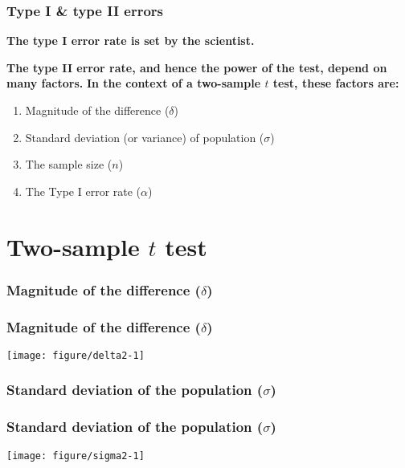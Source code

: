 \documentclass[color=usenames,dvipsnames]{beamer}\usepackage[]{graphicx}\usepackage[]{color}
\begin{document}
\begin{frame}
  \frametitle{Type I \& type II errors}
  {\bf The type I error rate is set by the scientist.} \par
  \pause
  \vfill
  {\bf The type II error rate, and hence the power of the test, depend
    on many factors.}
  \pause
  \vfill
  {\bf In the context of a two-sample $t$ test, these factors are:}
  \begin{enumerate}[\bf (1)]
    \item Magnitude of the difference ($\delta$)
    \item Standard deviation (or variance) of population ($\sigma$)
    \item The sample size ($n$)
    \item The Type I error rate ($\alpha$)
  \end{enumerate}
\end{frame}




\section{Two-sample $t$ test}



\begin{frame}[fragile]
  \frametitle{Magnitude of the difference ($\delta$)}


\end{frame}




\begin{frame}[fragile]
  \frametitle{Magnitude of the difference ($\delta$)}
\texttt{[image: figure/delta2-1]}
\end{frame}








\begin{frame}[fragile]
  \frametitle{Standard deviation of the population ($\sigma$)}


\end{frame}




\begin{frame}[fragile]
  \frametitle{Standard deviation of the population ($\sigma$)}
\texttt{[image: figure/sigma2-1]}
\end{frame}
\end{document}
